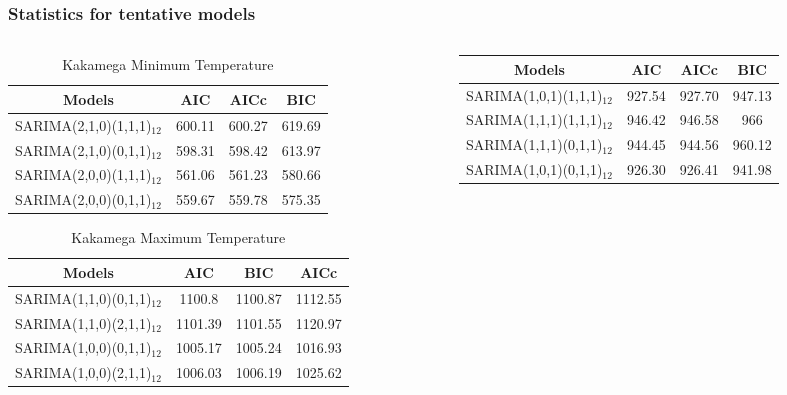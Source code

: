 \documentclass[]{beamer}
\begin{document}
\begin{frame}
\frametitle{Statistics for tentative models}
\fontsize{5pt}{7.2}\selectfont
\begin{columns}
\hspace*{-2cm}
\begin{column}{0.25\textwidth}
\begin{table}
\begin{tabular}{c c c c}
			Models&AIC&AICc&BIC\\
			\hline
			SARIMA(2,1,0)(1,1,1)$_{12}$ & 600.11 & 600.27 & 619.69\\			
			SARIMA(2,1,0)(0,1,1)$_{12}$ & 598.31 & 598.42 & 613.97\\			
			SARIMA(2,0,0)(1,1,1)$_{12}$ & 561.06 & 561.23 & 580.66\\			
			SARIMA(2,0,0)(0,1,1)$_{12}$ & 559.67 & 559.78 & 575.35\\
		\end{tabular}
		\caption{ Kakamega Minimum Temperature}
\end{table}
\begin{table}
		\begin{tabular}{c c c c}
			Models&AIC&BIC&AICc\\
			\hline
			SARIMA(1,1,0)(0,1,1)$_{12}$ & 1100.8 & 1100.87 & 1112.55\\			
			SARIMA(1,1,0)(2,1,1)$_{12}$ & 1101.39 & 1101.55 & 1120.97\\			
			SARIMA(1,0,0)(0,1,1)$_{12}$ & 1005.17 & 1005.24 & 1016.93\\			
			SARIMA(1,0,0)(2,1,1)$_{12}$ & 1006.03 & 1006.19 & 1025.62\\	
		\end{tabular}
		\caption{Kakamega Maximum Temperature}
		\label{tab:table5}
\end{table}
\end{column}
\begin{column}{.25\textwidth}
	\begin{table}[h!]
			\begin{tabular}{c c c c}
				Models & AIC & AICc & BIC\\
				\hline
				SARIMA(1,0,1)(1,1,1)$_{12}$ & 927.54 & 927.70 & 947.13\\
				SARIMA(1,1,1)(1,1,1)$_{12}$ & 946.42 & 946.58 & 966\\
				SARIMA(1,1,1)(0,1,1)$_{12}$ & 944.45 & 944.56 & 960.12\\
				SARIMA(1,0,1)(0,1,1)$_{12}$ & 926.30 & 926.41 & 941.98\\
			\end{tabular}

\end{table}
\end{column}
\end{columns}
\end{frame}
\end{document}
